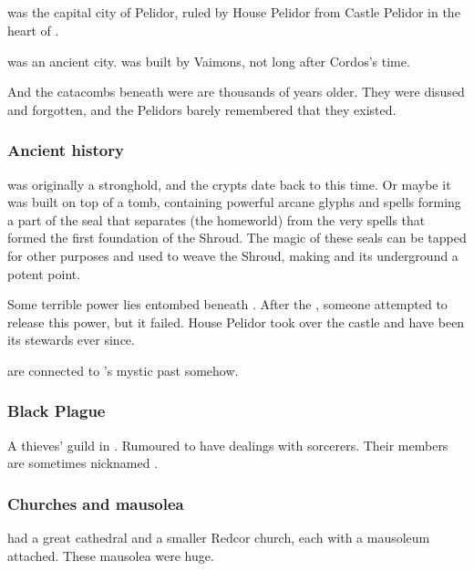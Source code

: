 \subsection[Malcur]{\Malcur}
\index{\Malcur}
\Malcur was the capital city of Pelidor, ruled by House Pelidor from Castle Pelidor in the heart of \Malcur. 

\Malcur was an ancient city. 
\CastlePelidor was built by Vaimons, not long after Cordos's time.

And the catacombs beneath were are thousands of years older. 
They were disused and forgotten, and the Pelidors barely remembered that they existed. 





\subsubsection{Ancient history}
\Malcur was originally a  stronghold, and the crypts date back to this time. Or maybe it was built on top of a \xzaishann{} tomb, containing powerful arcane glyphs and spells forming a part of the seal that separates \Machai{} (the  homeworld) from \Miith\dash the very spells that formed the first foundation of the Shroud. The magic of these seals can be tapped for other purposes and used to weave the Shroud, making \Malcur and its underground a potent \nexus{} point. 

Some terrible power lies entombed beneath \Malcur. After the \Darkfall, someone attempted to release this power, but it failed. House Pelidor took over the castle and have been its stewards ever since. 

 are connected to \Malcur's mystic past somehow.





\subsubsection{Black Plague}
A thieves' guild in . 
Rumoured to have dealings with sorcerers. 
Their members are sometimes nicknamed . 





\subsubsection{Churches and mausolea}
\Malcur had a great \Telcra{} cathedral and a smaller Redcor church, each with a mausoleum attached. 
These mausolea were huge. 

